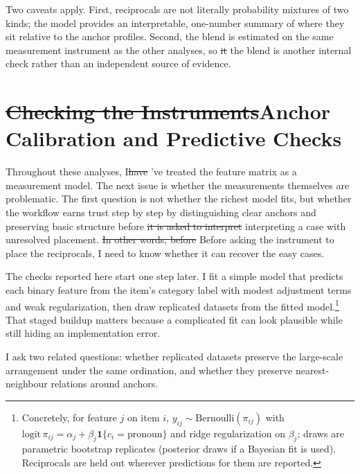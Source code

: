 \documentclass[12pt]{article}
\providecommand{\DIFaddtex}[1]{{\protect\color{DIFgreen}#1}} %
\providecommand{\DIFdeltex}[1]{{\protect\color{red}\sout{#1}}}                      %
\providecommand{\DIFaddbegin}{} %
\providecommand{\DIFaddend}{} %
\providecommand{\DIFdelbegin}{} %
\providecommand{\DIFdelend}{} %
\providecommand{\DIFadd}[1]{\texorpdfstring{\DIFaddtex{#1}}{#1}} %
\providecommand{\DIFdel}[1]{\texorpdfstring{\DIFdeltex{#1}}{}} %
\newcommand{\DIFscaledelfig}{0.5}
\newlength{\DIFdelgraphicswidth} %
\newlength{\DIFdelgraphicsheight} %
\newcommand{\DIFaddincludegraphics}[2][]{{\color{DIFgreen}\fbox{\DIFOincludegraphics[#1]{#2}}}} %
\newcommand{\DIFdelincludegraphics}[2][]{%
\sbox{\DIFdelgraphicsbox}{\DIFOincludegraphics[#1]{#2}}%
\settoboxwidth{\DIFdelgraphicswidth}{\DIFdelgraphicsbox} %
\settoboxtotalheight{\DIFdelgraphicsheight}{\DIFdelgraphicsbox} %
\scalebox{\DIFscaledelfig}{%
\parbox[b]{\DIFdelgraphicswidth}{\usebox{\DIFdelgraphicsbox}\\[-\baselineskip] \rule{\DIFdelgraphicswidth}{0em}}\llap{\resizebox{\DIFdelgraphicswidth}{\DIFdelgraphicsheight}{%
\setlength{\unitlength}{\DIFdelgraphicswidth}%
\begin{picture}(1,1)%
\thicklines\linethickness{2pt} %
{\color[rgb]{1,0,0}\put(0,0){\framebox(1,1){}}}%
{\color[rgb]{1,0,0}\put(0,0){\line( 1,1){1}}}%
{\color[rgb]{1,0,0}\put(0,1){\line(1,-1){1}}}%
\end{picture}%
}\hspace*{3pt}}} %
} %
\DeclareRobustCommand{\DIFaddbegin}{\DIFOaddbegin \let\includegraphics\DIFaddincludegraphics} %
\DeclareRobustCommand{\DIFaddend}{\DIFOaddend \let\includegraphics\DIFOincludegraphics} %
\DeclareRobustCommand{\DIFdelbegin}{\DIFOdelbegin \let\includegraphics\DIFdelincludegraphics} %
\DeclareRobustCommand{\DIFdelend}{\DIFOaddend \let\includegraphics\DIFOincludegraphics} %
\begin{document}
Two caveats apply. First, reciprocals are not literally probability mixtures of two kinds; the model provides an interpretable, one-number summary of where they sit relative to the anchor profiles. Second, the blend is estimated on the same measurement instrument as the other analyses, so \DIFdelbegin \DIFdel{it }\DIFdelend \DIFaddbegin \DIFadd{the blend }\DIFaddend is another internal check rather than an independent source of evidence.


\section{\DIFdelbegin \DIFdel{Checking the Instruments}\DIFdelend \DIFaddbegin \DIFadd{Anchor Calibration and Predictive Checks}\DIFaddend }

Throughout these analyses, I\DIFdelbegin \DIFdel{have }\DIFdelend \DIFaddbegin \DIFadd{'ve }\DIFaddend treated the feature matrix as a measurement model. The next issue is whether the measurements themselves are problematic. The first question is not whether the richest model fits, but whether the workflow earns trust step by step by distinguishing clear anchors and preserving basic structure before \DIFdelbegin \DIFdel{it is asked to interpret }\DIFdelend \DIFaddbegin \DIFadd{interpreting }\DIFaddend a case with unresolved placement. \DIFdelbegin \DIFdel{In other words, before }\DIFdelend \DIFaddbegin \DIFadd{Before }\DIFaddend asking the instrument to place the reciprocals, I need to know whether it can recover the easy cases.

The checks reported here start one step later. I fit a simple model that predicts each binary feature from the item's category label with modest adjustment terms and weak regularization, then draw replicated datasets from the fitted model.\footnote{Concretely, for feature $j$ on item $i$, $y_{ij}\sim\mathrm{Bernoulli}(\pi_{ij})$ with $\mathrm{logit}\,\pi_{ij}=\alpha_j+\beta_j\mathbf{1}\{c_i=\text{pronoun}\}$ and ridge regularization on $\beta_j$; draws are parametric bootstrap replicates (posterior draws if a Bayesian fit is used). Reciprocals are held out wherever predictions for them are reported.} That staged buildup matters because a complicated fit can look plausible while still hiding an implementation error.

I ask two related questions: whether replicated datasets preserve the large-scale arrangement under the same ordination, and whether they preserve nearest-neighbour relations around anchors.
\end{document}
